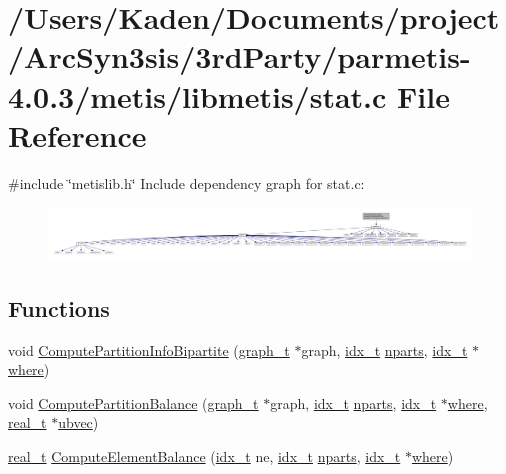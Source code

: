\hypertarget{a00963}{}\section{/\+Users/\+Kaden/\+Documents/project/\+Arc\+Syn3sis/3rd\+Party/parmetis-\/4.0.3/metis/libmetis/stat.c File Reference}
\label{a00963}
{\ttfamily \#include \char`\"{}metislib.\+h\char`\"{}}\newline
Include dependency graph for stat.\+c\+:\nopagebreak
\begin{figure}[H]
\begin{center}
\leavevmode
\includegraphics[width=350pt]{a00964}
\end{center}
\end{figure}
\subsection*{Functions}
\begin{DoxyCompactItemize}
\item 
void \hyperlink{a00963_a8f9b0cf2c2f1b208f0947f471da6ab04}{Compute\+Partition\+Info\+Bipartite} (\hyperlink{a00734}{graph\+\_\+t} $\ast$graph, \hyperlink{a00876_aaa5262be3e700770163401acb0150f52}{idx\+\_\+t} \hyperlink{a00879_aad88065af88fd6759101788a8e15ce9e}{nparts}, \hyperlink{a00876_aaa5262be3e700770163401acb0150f52}{idx\+\_\+t} $\ast$\hyperlink{a00879_a7a355801f721e9d8d4ae03590a3a56b0}{where})
\item 
void \hyperlink{a00963_aaae826710f48d49c2961c5507760e6f0}{Compute\+Partition\+Balance} (\hyperlink{a00734}{graph\+\_\+t} $\ast$graph, \hyperlink{a00876_aaa5262be3e700770163401acb0150f52}{idx\+\_\+t} \hyperlink{a00879_aad88065af88fd6759101788a8e15ce9e}{nparts}, \hyperlink{a00876_aaa5262be3e700770163401acb0150f52}{idx\+\_\+t} $\ast$\hyperlink{a00879_a7a355801f721e9d8d4ae03590a3a56b0}{where}, \hyperlink{a00876_a1924a4f6907cc3833213aba1f07fcbe9}{real\+\_\+t} $\ast$\hyperlink{a00879_af48bb348bc8440a61f90f137de83f203}{ubvec})
\item 
\hyperlink{a00876_a1924a4f6907cc3833213aba1f07fcbe9}{real\+\_\+t} \hyperlink{a00963_a98c28fb34f447f219799acdb79c3bff9}{Compute\+Element\+Balance} (\hyperlink{a00876_aaa5262be3e700770163401acb0150f52}{idx\+\_\+t} ne, \hyperlink{a00876_aaa5262be3e700770163401acb0150f52}{idx\+\_\+t} \hyperlink{a00879_aad88065af88fd6759101788a8e15ce9e}{nparts}, \hyperlink{a00876_aaa5262be3e700770163401acb0150f52}{idx\+\_\+t} $\ast$\hyperlink{a00879_a7a355801f721e9d8d4ae03590a3a56b0}{where})
\end{DoxyCompactItemize}


